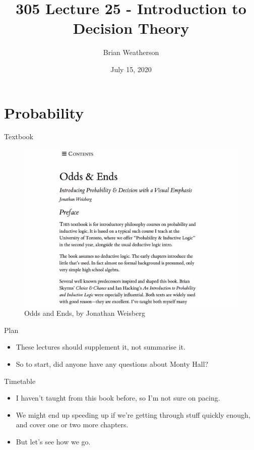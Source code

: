\documentclass[
  ignorenonframetext,
]{beamer}
\title{305 Lecture 25 - Introduction to Decision Theory}
\author{Brian Weatherson}
\date{July 15, 2020}
\providecommand{\tightlist}{%
  \setlength{\itemsep}{0pt}\setlength{\parskip}{0pt}}
\renewcommand{\,}{\text{, }}
\begin{document}
\frame{\titlepage}

\hypertarget{probability}{%
\section{Probability}\label{probability}}

\begin{frame}{Textbook}
\protect\hypertarget{textbook}{}

\begin{figure}
\centering
\includegraphics{images/class10/odds_and_ends.png}
\caption{Odds and Ends, by Jonathan Weisberg}
\end{figure}

\end{frame}

\begin{frame}{Plan}
\protect\hypertarget{plan}{}

\begin{itemize}[<+->]
\tightlist
\item
  These lectures should supplement it, not summarise it.
\item
  So to start, did anyone have any questions about Monty Hall?
\end{itemize}

\end{frame}

\begin{frame}{Timetable}
\protect\hypertarget{timetable}{}

\begin{itemize}[<+->]
\tightlist
\item
  I haven't taught from this book before, so I'm not sure on pacing.
\item
  We might end up speeding up if we're getting through stuff quickly
  enough, and cover one or two more chapters.
\item
  But let's see how we go.
\end{itemize}

\end{frame}
\end{document}
